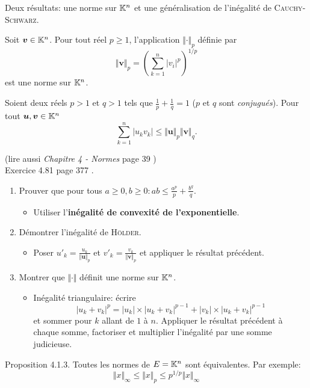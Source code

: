 Deux résultats: une norme sur $\mathbb{K}^n$ et une généralisation de l'inégalité de \textsc{Cauchy}-\textsc{Schwarz}. 
\begin{defi}
    Soit $\bm{v} \in \mathbb{K}^n$. Pour tout réel $p \geqslant 1$, l'application $\Vert \bm{\cdot} \Vert_p$ définie par
    $$\Vert \bm{v} \Vert_p = \left (\sum_{k=1}^{n} |v_i|^p \right)^{1/p}$$
    est une norme sur $\mathbb{K}^n$.
\end{defi}

\begin{prop}
    Soient deux réels $p > 1$ et $q > 1$ tels que $\frac{1}{p} + \frac{1}{q} = 1$ ($p$ et $q$ sont \emph{conjugués}). Pour tout $\bm{u}, \bm{v} \in \mathbb{K}^n$
    $$\sum_{k=1}^{n} |u_k v_k| \leqslant \Vert \bm{u} \Vert_p \Vert \bm{v} \Vert_q.$$
\end{prop}

\begin{preuve}(lire aussi \emph{Chapitre 4 - Normes} page 39 \cite{matrices}) \\
    Exercice 4.81 page 377 \cite{oraux_x_ens_3}.
    \begin{enumerate}
        \item Prouver que pour tous $a \geqslant 0, b \geqslant 0: ab \leqslant \frac{a^p}{p} + \frac{b^q}{q}$.
        \begin{itemize}
            \item Utiliser l'\textbf{inégalité de convexité de l'exponentielle}.
        \end{itemize}
        \item Démontrer l'inégalité de \textsc{Hölder}.
        \begin{itemize}
            \item Poser $u'_k = \frac{u_k}{\Vert \bm{u} \Vert_p}$ et $v'_k = \frac{v_k}{\Vert \bm{v} \Vert_p}$ et appliquer le résultat précédent. 
        \end{itemize}
        \item Montrer que $\Vert \bm{\cdot} \Vert$ définit une norme sur $\mathbb{K}^n$.
        \begin{itemize}
            \item Inégalité triangulaire: écrire 
            $$|u_k + v_k|^p = |u_k| \times |u_k + v_k|^{p-1} + |v_k| \times |u_k + v_k|^{p-1}$$ 
            et sommer pour $k$ allant de $1$ à $n$. Appliquer le résultat précédent à chaque somme, factoriser et multiplier l'inégalité par une somme judicieuse. 
        \end{itemize}
    \end{enumerate}
\end{preuve}     

\begin{box_titre}{Proposition 4.1.3. \cite{matrices}}
    Toutes les normes de $E = \mathbb{K}^n$ sont équivalentes. Par exemple:
    $$\Vert x \Vert_\infty \leqslant \Vert x \Vert_p \leqslant p^{1/p} \Vert x \Vert_\infty$$
\end{box_titre}
